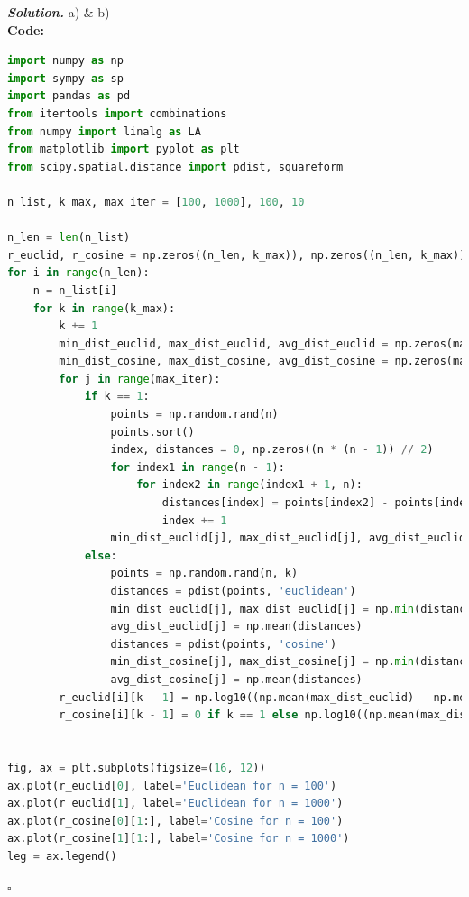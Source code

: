 \documentclass[12pt]{article}
\newenvironment{solution}[1][\it{Solution}]{\textbf{#1. } }{$\square$}
\begin{document}
\begin{solution}
a) \& b)\\
\textbf{Code:}

\begin{lstlisting}[language=Python]
import numpy as np
import sympy as sp
import pandas as pd
from itertools import combinations
from numpy import linalg as LA
from matplotlib import pyplot as plt
from scipy.spatial.distance import pdist, squareform

n_list, k_max, max_iter = [100, 1000], 100, 10

n_len = len(n_list)
r_euclid, r_cosine = np.zeros((n_len, k_max)), np.zeros((n_len, k_max))
for i in range(n_len):
    n = n_list[i]
    for k in range(k_max):
        k += 1
        min_dist_euclid, max_dist_euclid, avg_dist_euclid = np.zeros(max_iter), np.zeros(max_iter), np.zeros(max_iter)
        min_dist_cosine, max_dist_cosine, avg_dist_cosine = np.zeros(max_iter), np.zeros(max_iter), np.zeros(max_iter)
        for j in range(max_iter):
            if k == 1:
                points = np.random.rand(n)
                points.sort()
                index, distances = 0, np.zeros((n * (n - 1)) // 2)
                for index1 in range(n - 1):
                    for index2 in range(index1 + 1, n):
                        distances[index] = points[index2] - points[index1]
                        index += 1
                min_dist_euclid[j], max_dist_euclid[j], avg_dist_euclid[j] = np.min(distances), np.max(points) - np.min(points), np.mean(distances)
            else:
                points = np.random.rand(n, k)
                distances = pdist(points, 'euclidean')
                min_dist_euclid[j], max_dist_euclid[j] = np.min(distances), np.max(distances)
                avg_dist_euclid[j] = np.mean(distances)
                distances = pdist(points, 'cosine')
                min_dist_cosine[j], max_dist_cosine[j] = np.min(distances), np.max(distances)
                avg_dist_cosine[j] = np.mean(distances)
        r_euclid[i][k - 1] = np.log10((np.mean(max_dist_euclid) - np.mean(min_dist_euclid)) / np.mean(avg_dist_euclid))
        r_cosine[i][k - 1] = 0 if k == 1 else np.log10((np.mean(max_dist_cosine) - np.mean(min_dist_cosine)) / np.mean(avg_dist_cosine))
        

fig, ax = plt.subplots(figsize=(16, 12))
ax.plot(r_euclid[0], label='Euclidean for n = 100')
ax.plot(r_euclid[1], label='Euclidean for n = 1000')
ax.plot(r_cosine[0][1:], label='Cosine for n = 100')
ax.plot(r_cosine[1][1:], label='Cosine for n = 1000')
leg = ax.legend()
\end{lstlisting}


\end{solution}
\end{document}
